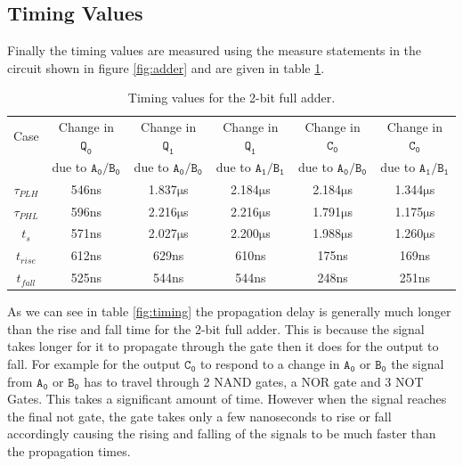 \documentclass[12pt, titlepage]{article}
\newcommand\Aa{\ensuremath{\mathtt{A_0}}}
\newcommand\Ab{\ensuremath{\mathtt{A_1}}}
\newcommand\Ba{\ensuremath{\mathtt{B_0}}}
\newcommand\Bb{\ensuremath{\mathtt{B_1}}}
\newcommand\Qa{\ensuremath{\mathtt{Q_0}}}
\newcommand\Qb{\ensuremath{\mathtt{Q_1}}}
\newcommand\Ca{\ensuremath{\mathtt{C_0}}}
\newcommand\us{$\mathrm{\mu}$s}
\begin{document}
    \subsection{Timing Values}
    Finally the timing values are measured using the measure statements
    in the circuit shown in figure \ref{fig:adder} and are given in
    table \ref{tab:timings}.
    \begin{table}[H]
        \centering
        \caption{Timing values for the 2-bit full adder.}
        \label{tab:timings}
        \begin{tabular}{c|c|c|c|c|c}
            Case & Change in $\Qa$ & Change in $\Qb$ & Change in $\Qb$ &
            Change in $\Ca$ & Change in $\Ca$\\
            & due to $\Aa/\Ba$ & due to $\Aa/\Ba$ & due to $\Ab/\Bb$ &
            due to $\Aa/\Ba$ & due to $\Ab/\Bb$\\
            \hline
            $\tau_{PLH} $ & 546ns & 1.837\us & 2.184\us & 2.184\us &
            1.344\us\\
            $\tau_{PHL} $ & 596ns & 2.216\us & 2.216\us & 1.791\us &
            1.175\us\\
            $t_s$      & 571ns & 2.027\us & 2.200\us & 1.988\us &
            1.260\us\\
            $t_{rise}$ & 612ns & 629ns & 610ns & 175ns & 169ns\\
            $t_{fall}$ & 525ns & 544ns & 544ns & 248ns & 251ns
        \end{tabular}
    \end{table}
    As we can see in table \ref{fig:timing} the propagation delay is
    generally much longer than the rise and fall time for the 2-bit full
    adder. This is because the signal takes longer for it to propagate
    through the gate then it does for the output to fall. For example
    for the output $\Ca$ to respond to a change in $\Aa$ or $\Ba$ the
    signal from $\Aa$ or $\Ba$ has to travel through 2 NAND gates, a NOR
    gate and 3 NOT Gates. This takes a significant amount of time.
    However when the signal reaches the final not gate, the gate takes
    only a few nanoseconds to rise or fall accordingly causing the
    rising and falling of the signals to be much faster than the
    propagation times.\\
\end{document}
